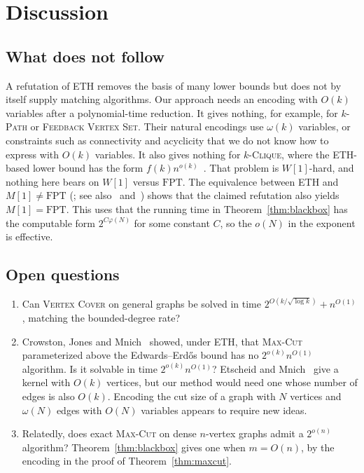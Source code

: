 \documentclass[11pt]{amsart}
\theoremstyle{definition}
\theoremstyle{remark}
\newcommand{\VC}{\textup{\textsc{Vertex Cover}}}
\newcommand{\MC}{\textup{\textsc{Max-Cut}}}
\newcommand{\FPT}{\mathrm{FPT}}
\begin{document}
\section{Discussion}

\subsection{What does not follow}
A refutation of ETH removes the basis of many lower bounds but does not by itself supply matching algorithms. Our approach needs an encoding with $O(k)$ variables after a polynomial-time reduction. It gives nothing, for example, for $k$-\textsc{Path} or \textsc{Feedback Vertex Set}. Their natural encodings use $\omega(k)$ variables, or constraints such as connectivity and acyclicity that we do not know how to express with $O(k)$ variables. It also gives nothing for $k$-\textsc{Clique}, where the ETH-based lower bound has the form $f(k)n^{o(k)}$~\cite{CHKX06}. That problem is $W[1]$-hard, and nothing here bears on $W[1]$ versus $\FPT$. The equivalence between ETH and $M[1]\ne\FPT$ (\cite{DEFPR03}; see also~\cite{CG07} and~\cite[Section~16.6]{FG06}) shows that the claimed refutation also yields $M[1]=\FPT$. This uses that the running time in Theorem~\ref{thm:blackbox} has the computable form $2^{C\varphi(N)}$ for some constant $C$, so the $o(N)$ in the exponent is effective.

\subsection{Open questions}
\begin{enumerate}[label=(\arabic*)]
\item Can \VC{} on general graphs be solved in time $2^{O(k/\sqrt{\log k})}+n^{O(1)}$, matching the bounded-degree rate?
\item Crowston, Jones and Mnich~\cite{CJM12} showed, under ETH, that \MC{} parameterized above the Edwards--Erd\H{o}s bound has no $2^{o(k)}n^{O(1)}$ algorithm. Is it solvable in time $2^{o(k)}n^{O(1)}$? Etscheid and Mnich~\cite{EM18} give a kernel with $O(k)$ vertices, but our method would need one whose number of edges is also $O(k)$. Encoding the cut size of a graph with $N$ vertices and $\omega(N)$ edges with $O(N)$ variables appears to require new ideas.
\item Relatedly, does exact \MC{} on dense $n$-vertex graphs admit a $2^{o(n)}$ algorithm? Theorem~\ref{thm:blackbox} gives one when $m=O(n)$, by the encoding in the proof of Theorem~\ref{thm:maxcut}.
\end{enumerate}
\end{document}
